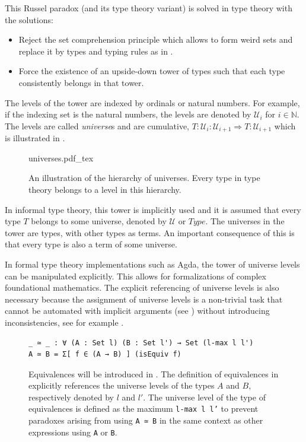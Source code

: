 \documentclass[12pt,a4paper,twoside,xetex]{book} %
\newcommand{\keyword}[1]{\emph{#1}\index{#1}}
\newcommand{\incfig}[1]{%
    \def\svgwidth{0.6\columnwidth}
    {#1.pdf_tex}
}
\begin{document}
This Russel paradox (and its type theory variant) is solved in type theory with the solutions:

\begin{itemize}
 \item Reject the set comprehension principle which allows to form weird sets and replace it by types and typing rules as in .
 \item  Force the existence of an upside-down tower of types such that each type consistently belongs in that tower. 
 
\end{itemize}
 
The levels of the tower are indexed by ordinals or natural numbers. For example, if the indexing set is the natural numbers, the levels are denoted by $\mathcal{U}_i$ for $i\in \mathbb{N}$. The levels are called \keyword{universe}s and are cumulative, $T: 
\mathcal{U}_i:\mathcal{U}_{i+1} \Rightarrow T : \mathcal{U}_{i+1}$ which is illustrated in .

\begin{figure}\label{universefig}
\centering
\incfig{universes}
\caption{An illustration of the hierarchy of universes. Every type in type theory belongs to a level in this hierarchy.}
\end{figure}



In informal type theory, this tower is implicitly used and it is assumed that 
every type $T$ belongs to some universe, denoted by $\mathcal{U}$ or $Type$. The 
universes in the tower are types, with other types as terms. An 
important consequence of this is that every type is also a term of some 
universe.

In formal type theory implementations such as Agda, the tower of universe levels 
can be manipulated explicitly. This allows for formalizations of 
complex foundational mathematics. The explicit referencing of universe levels is also necessary because the assignment of universe levels is a non-trivial task that cannot be automated with implicit arguments (see ) without introducing inconsistencies, see for example .

\begin{figure}\label{AgdaEquivalences}
\centering
\begin{BVerbatim}
_ ≃ _ : ∀ (A : Set l) (B : Set l') → Set (l-max l l')
A ≃ B = Σ[ f ∈ (A → B) ] (isEquiv f)
\end{BVerbatim}

\caption{Equivalences will be introduced in . The definition 
of equivalences in \cite{Moertberg2018} explicitly references the 
universe levels of the types $A$ and $B$, respectively denoted by $l$ and $l'$. 
The universe level of the type of equivalences is defined as the maximum \texttt{l-max l l'} 
to prevent paradoxes arising from using \texttt{A ≃ B} in the same context as 
other expressions using \texttt{A} or \texttt{B}.}
\end{figure}
\end{document}
